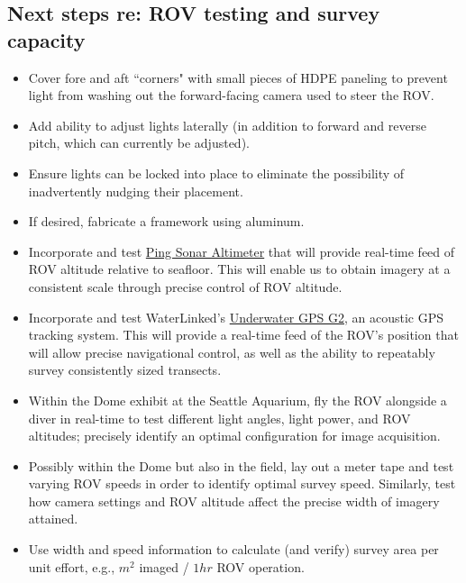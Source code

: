 \documentclass[11pt]{article}
\newcommand{\pt}{\vspace{-.5em}} %
\begin{document}
\subsection{Next steps re: ROV testing and survey capacity}
\begin{itemize}
\item Cover fore and aft ``corners" with small pieces of HDPE paneling 
to prevent light from washing out the forward-facing camera used to 
steer the ROV.
\pt
\item Add ability to adjust lights laterally (in addition to forward 
and reverse pitch, which can currently be adjusted).
\pt
\item Ensure lights can be locked into place to eliminate the 
possibility of inadvertently nudging their placement. 
\pt
\item If desired, fabricate a framework using aluminum. 
\pt
\item Incorporate and test 
\href{https://bluerobotics.com/store/sensors-sonars-cameras/sonar/ping-sonar-r2-rp/}{Ping
 Sonar Altimeter} that will provide real-time feed of ROV altitude 
 relative to seafloor. 
This will enable us to obtain imagery at a consistent scale through 
precise control of ROV altitude. 
\pt
\item Incorporate and test WaterLinked's 
\href{https://store.waterlinked.com/product/underwater-gps-g2/}{Underwater
 GPS G2}, an acoustic GPS tracking system. 
This will provide a real-time feed of the ROV's position that will 
allow precise navigational control, as well as the ability to 
repeatably survey consistently sized transects.
\pt
\item Within the Dome exhibit at the Seattle Aquarium, fly the ROV 
alongside a diver in real-time to test different light angles, light 
power, and ROV altitudes; 
precisely identify an optimal configuration for image acquisition. 
\pt
\item Possibly within the Dome but also in the field, lay out a meter 
tape and test varying ROV speeds in order to identify optimal survey 
speed. 
Similarly, test how camera settings and ROV altitude affect the precise 
width of imagery attained. 
\pt
\item Use width and speed information to calculate (and verify) survey 
area per unit effort, e.g., $m^2$ imaged / $1hr$ ROV operation.   
\end{itemize}
\end{document}
